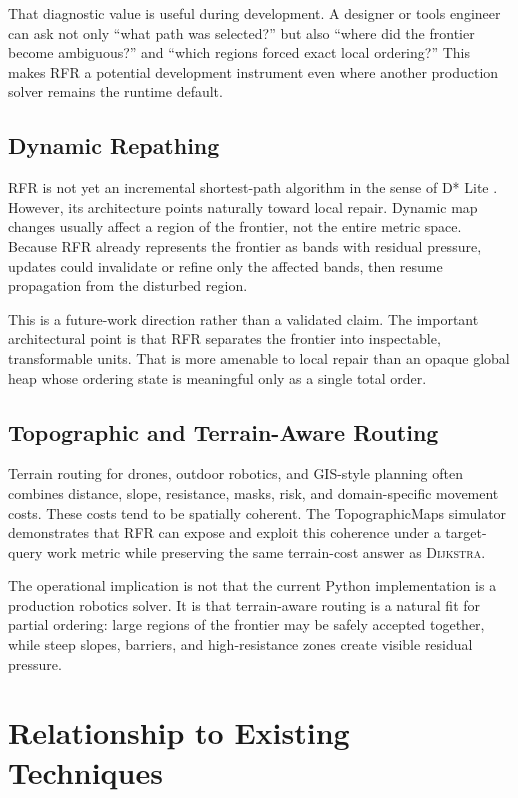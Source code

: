 \documentclass[11pt]{article}
\newcommand{\RFR}{\textsc{RFR}}
\newcommand{\Dijkstra}{\textsc{Dijkstra}}
\begin{document}
That diagnostic value is useful during development. A designer or tools engineer can ask not only ``what path was selected?'' but also ``where did the frontier become ambiguous?'' and ``which regions forced exact local ordering?'' This makes \RFR{} a potential development instrument even where another production solver remains the runtime default.

\subsection{Dynamic Repathing}

\RFR{} is not yet an incremental shortest-path algorithm in the sense of D* Lite \cite{koenig2002}. However, its architecture points naturally toward local repair. Dynamic map changes usually affect a region of the frontier, not the entire metric space. Because \RFR{} already represents the frontier as bands with residual pressure, updates could invalidate or refine only the affected bands, then resume propagation from the disturbed region.

This is a future-work direction rather than a validated claim. The important architectural point is that \RFR{} separates the frontier into inspectable, transformable units. That is more amenable to local repair than an opaque global heap whose ordering state is meaningful only as a single total order.

\subsection{Topographic and Terrain-Aware Routing}

Terrain routing for drones, outdoor robotics, and GIS-style planning often combines distance, slope, resistance, masks, risk, and domain-specific movement costs. These costs tend to be spatially coherent. The TopographicMaps simulator demonstrates that \RFR{} can expose and exploit this coherence under a target-query work metric while preserving the same terrain-cost answer as \Dijkstra{}.

The operational implication is not that the current Python implementation is a production robotics solver. It is that terrain-aware routing is a natural fit for partial ordering: large regions of the frontier may be safely accepted together, while steep slopes, barriers, and high-resistance zones create visible residual pressure.

\section{Relationship to Existing Techniques}
\end{document}
